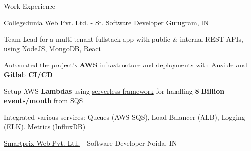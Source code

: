 \documentclass[../resume.tex]{subfiles}
\begin{document}
\begin{rSection}{Work Experience}
\begin{rSubsection}
\end{rSubsection}

\begin{rSubsection}
    {\href{https://go.rohit.page/cd}{Collegedunia Web Pvt. Ltd.}}
    {  -  }
    {Sr. Software Developer}
    {Gurugram, IN}

    \item Team Lead for a multi-tenant fullstack app with public \& internal REST APIs, using NodeJS, MongoDB, React
    \item Automated the project's \textbf{AWS} infrastructure and deployments with Ansible and \textbf{Gitlab CI/CD}
    \item Setup AWS \textbf{Lambdas} using \href{https://www.serverless.com/}{serverless framework} for handling \textbf{8 Billion events/month} from SQS
    \item Integrated various services: Queues (AWS SQS), Load Balancer (ALB), Logging (ELK), Metrics (InfluxDB)

\end{rSubsection}

\begin{rSubsection}
    {\href{https://go.rohit.page/smpx}{Smartprix Web Pvt. Ltd.}}
    {  -  }
    {Software Developer}
    {Noida, IN}


\end{rSubsection}
\end{rSection}
\end{document}
